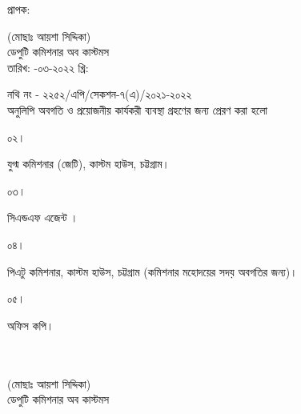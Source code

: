 \documentclass[12pt]{article}
\newcommand{\fileno}{নথি নং - ২২৫২/এপি/সেকশন-৭(এ)/২০২১-২০২২}
\newcommand{\impn}{\jeal}
\newcommand{\impadd}{\jeala}
\newcommand{\rodt}{\hspace{3em}-০৩-২০২২ খ্রি:}
\begin{document}
\begin{minipage}[t]{0.05\linewidth}
প্রাপক:
\end{minipage}
\begin{minipage}[t]{0.65\linewidth}
{\impn}
\end{minipage}
\begin{minipage}[t]{0.30\linewidth}
\hspace{0em}
\end{minipage}
\begin{minipage}[t]{0.05\linewidth}
\hspace{0em}
\end{minipage}
\begin{minipage}[t]{0.65\linewidth}
{\impadd}
\end{minipage}
\begin{minipage}[t]{0.30\linewidth}
\begin{center}
(মোছাঃ আয়শা সিদ্দিকা)
\\
ডেপুটি কমিশনার অব কাস্টমস
\\
তারিখ: {\rodt}
\end{center}
\end{minipage}
\newline
{\fileno}
\\
অনুলিপি অবগতি ও প্রয়োজনীয় কার্যকরী ব্যবস্থা গ্রহণের জন্য প্রেরণ করা হলো
\\
\begin{minipage}[t]{0.06\linewidth}
০২।
\end{minipage}
\begin{minipage}[t]{0.94\linewidth}
যুগ্ম কমিশনার (জেটি), কাস্টম হাউস, চট্টগ্রাম।
\end{minipage}
\begin{minipage}[t]{0.06\linewidth}
০৩।
\end{minipage}
\begin{minipage}[t]{0.94\linewidth}
সিএন্ডএফ এজেন্ট {\cnfn}।
\end{minipage}
\begin{minipage}[t]{0.06\linewidth}
০৪।
\end{minipage}
\begin{minipage}[t]{0.94\linewidth}
পিএটু কমিশনার, কাস্টম হাউস, চট্টগ্রাম (কমিশনার মহোদয়ের সদয় অবগতির জন্য)।
\end{minipage}
\begin{minipage}[t]{0.06\linewidth}
০৫।
\end{minipage}
\begin{minipage}[t]{0.94\linewidth}
অফিস কপি।
\\
\\
\\
\end{minipage}
\begin{minipage}[t]{0.70\linewidth}
\hspace{0em}
\end{minipage}
\begin{minipage}[t]{0.30\linewidth}
\begin{center}
(মোছাঃ আয়শা সিদ্দিকা)
\\
ডেপুটি কমিশনার অব কাস্টমস
\end{center}
\end{minipage}
\thispagestyle{laststyle}
\end{document}
